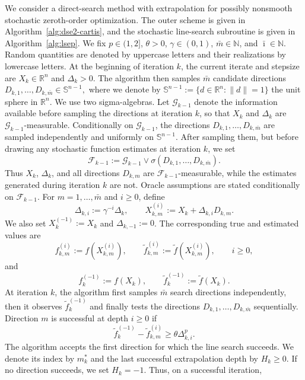 \documentclass[11pt,a4paper]{article}
\newcommand{\Imax}{\bar{\imath}}%
\newcommand{\Dexp}{p}
\begin{document}
We consider a direct-search method with extrapolation for possibly nonsmooth
stochastic zeroth-order optimization. The outer scheme is given in
Algorithm~\ref{alg:dse2-cartis}, and the stochastic line-search subroutine is given in
Algorithm~\ref{alg:lsep}. We fix $\Dexp\in (1,2]$, $\theta>0$, $\gamma\in(0,1)$, 
$\bar{m}\in\mathbb N$,  and $\Imax\in\mathbb N$.
Random
quantities are denoted by uppercase letters and their realizations by lowercase
letters. At the beginning of iteration $k$, the current iterate and stepsize are
$X_k\in\mathbb R^n$ and $\Delta_k>0$. The algorithm then samples
$\bar{m}$ candidate directions
$D_{k,1},\ldots,D_{k,\bar{m}}\in\mathbb S^{n-1},
$
where we denote by
\(
    \mathbb S^{n-1}
    :=
    \{d\in\mathbb R^n:\|d\|=1\}
\)
the unit sphere in \(\mathbb R^n\). We use two sigma-algebras. Let $\mathcal G_{k-1}$ denote the information
available before sampling the directions at iteration $k$, so that $X_k$ and
$\Delta_k$ are $\mathcal G_{k-1}$-measurable. Conditionally on
$\mathcal G_{k-1}$, the directions $D_{k,1},\ldots,D_{k,\bar{m}}$ are sampled
independently and uniformly on $\mathbb S^{n-1}$. After sampling them, but
before drawing any stochastic function estimates at iteration $k$, we set
\[
    \mathcal F_{k-1}
    :=
    \mathcal G_{k-1}
    \vee
    \sigma(D_{k,1},\ldots,D_{k,\bar{m}}).
\]
Thus $X_k$, $\Delta_k$, and all directions $D_{k,m}$ are
$\mathcal F_{k-1}$-measurable, while the estimates generated during iteration
$k$ are not. Oracle assumptions are stated conditionally on
$\mathcal F_{k-1}$. For $m=1,\ldots,\bar{m}$ and $i\ge0$, define
\[
    \Delta_{k,i}:=\gamma^{-i}\Delta_k,
    \qquad
    X_{k,m}^{(i)}:=X_k+\Delta_{k,i}D_{k,m}.
\]
We also set $X_k^{(-1)}:=X_k$ and $\Delta_{k,-1}:=0$. The corresponding true and
estimated values are
\[
    f_{k,m}^{(i)}:=f(X_{k,m}^{(i)}),
    \qquad
    \tilde f_{k,m}^{(i)}:=\tilde f(X_{k,m}^{(i)}),
    \qquad i\ge0,
\]
and
\[
    f_k^{(-1)}:=f(X_k),
    \qquad
    \tilde f_k^{(-1)}:=\tilde f(X_k).
\]
At iteration $k$, the algorithm first samples $\bar{m}$ search directions independently, then it observes $\tilde f_k^{(-1)}$ and finally
tests the directions $D_{k,1},\ldots,D_{k,\bar{m}}$ sequentially. Direction $m$ is
successful at depth $i\ge0$ if
\[
    \tilde f_k^{(-1)}-\tilde f_{k,m}^{(i)}
    \ge
    \theta\Delta_{k,i}^{\Dexp}.
\]
The algorithm accepts the first direction for which the line search succeeds.
We denote its index by $m_k^*$ and the last successful extrapolation depth by
$H_k\ge0$. If no direction succeeds, we set $H_k=-1$. Thus, on a successful iteration,
\end{document}
